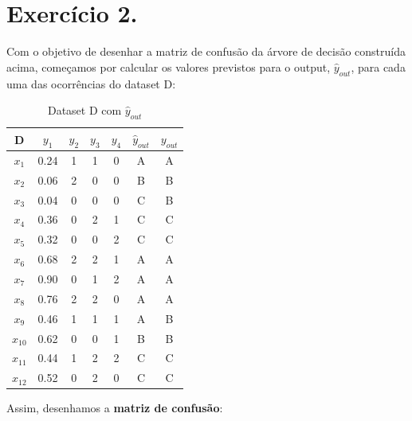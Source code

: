 \documentclass{article}
\begin{document}
\section*{Exercício 2.}

Com o objetivo de desenhar a matriz de confusão da árvore de decisão construída acima, começamos por calcular os valores previstos para o output, $\hat{y}_{out}$, para cada uma das ocorrências do dataset D:

\begin{table}[h!]
  \centering
  \begin{tabular}{|c|c|c|c|c|c|c|}
    \hline
        D     & $y_1$ & $y_2$ & $y_3$ & $y_4$ & $\hat{y}_{out}$ & $y_{out}$ \\ \hline
        $x_1$ & 0.24   & 1     & 1     & 0     & A         & A         \\ \hline
        $x_2$ & 0.06   & 2     & 0     & 0     & B         & B         \\ \hline
        $x_3$ & 0.04   & 0     & 0     & 0     & C         & B         \\ \hline
        $x_4$ & 0.36   & 0     & 2     & 1     & C         & C         \\ \hline
        $x_5$ & 0.32   & 0     & 0     & 2     & C         & C         \\ \hline
        $x_6$ & 0.68   & 2     & 2     & 1     & A         & A         \\ \hline
        $x_7$ & 0.90   & 0     & 1     & 2     & A         & A         \\ \hline
        $x_8$ & 0.76   & 2     & 2     & 0     & A         & A         \\ \hline
        $x_9$ & 0.46   & 1     & 1     & 1     & A         & B         \\ \hline
        $x_{10}$ & 0.62   & 0     & 0     & 1     & B         & B         \\ \hline
        $x_{11}$ & 0.44   & 1     & 2     & 2     & C         & C         \\ \hline
        $x_{12}$ & 0.52   & 0     & 2     & 0     & C         & C         \\ \hline
    \end{tabular}
  \caption{Dataset D com $\hat{y}_{out}$}
  \label{tab:datasetD_comprev}
\end{table}

Assim, desenhamos a \textbf{matriz de confusão}:
\end{document}
